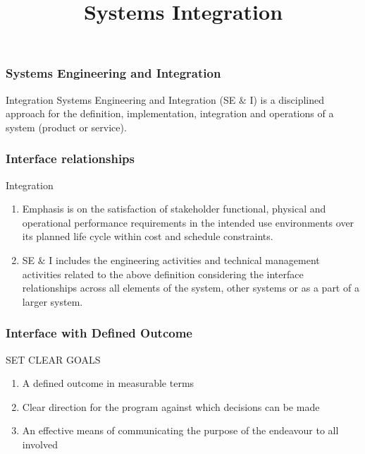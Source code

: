 

\title[Systems Engineering]{ Systems Integration  } 



\begin{frame}
\frametitle{Systems Engineering and Integration}
\begin{block}{Integration  }
Systems Engineering and Integration (SE $\& $ I) is a disciplined approach for the definition, implementation, integration and operations of a system (product or service). 

\end{block}
\end{frame}



\begin{frame}
\frametitle{Interface relationships}
\begin{block}{Integration  }

\begin{enumerate}
    \item   Emphasis is on the satisfaction of stakeholder functional, physical and operational performance requirements in the intended use environments over its planned life cycle within cost and schedule constraints.
    \item SE $\& $ I includes the engineering activities and technical management activities related to the above definition considering the interface relationships across all elements of the system, other systems or as a part of a larger system.
\end{enumerate}

 
\end{block}
\end{frame}

\begin{frame}
\frametitle{Interface with Defined Outcome }
\begin{block}{SET CLEAR GOALS}

\begin{enumerate}
    \item  A defined outcome in measurable terms
   \item  Clear direction for the program against which decisions can be made
    \item  An effective means of communicating the purpose of the endeavour to all involved
\end{enumerate}

\end{block}
\end{frame}





